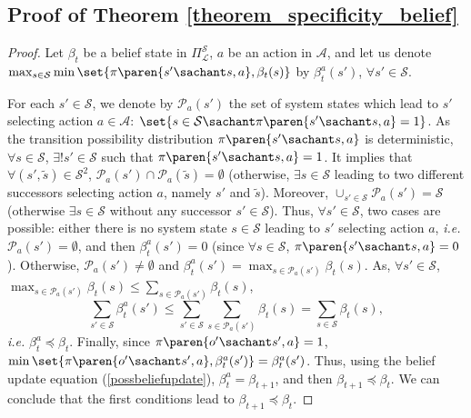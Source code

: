 \subsection{Proof of Theorem \ref{theorem_specificity_belief}}
\label{theorem_specificity_belief_RETURN}
\begin{proof}
Let $\beta_t$ be a belief state in $\Pi^{\mathcal{S}}_{\mathcal{L}}$,
$a$ be an action in $\mathcal{A}$,
and let us denote $\max_{s \in \mathcal{S}}\min \set{ \pi \paren{s' \sachant s,a}, \beta_t(s)}$ 
by $\beta^a_t(s')$, $\forall s' \in \mathcal{S}$.

For each $s' \in \mathcal{S}$, 
we denote by $\mathcal{P}_a(s')$ the set of system states
which lead to $s'$ selecting action $a \in \mathcal{A}$:
$\set{ s \in \mathcal{S} \sachant \pi \paren{ s' \sachant s,a }=1 }$.
As the transition possibility distribution $\pi \paren{ s' \sachant s,a }$ is
deterministic, $\forall s \in \mathcal{S}$, 
$\exists ! s' \in \mathcal{S}$ such that $\pi \paren{ s' \sachant s,a } = 1$.
It implies that $\forall (s',\tilde{s}) \in \mathcal{S}^2$,
$\mathcal{P}_a(s') \cap \mathcal{P}_a(\tilde{s}) = \emptyset$
(otherwise, $\exists s \in \mathcal{S}$ leading 
to two different successors
selecting action $a$, 
namely $s'$ and $\tilde{s}$).
Moreover, $\cup_{s' \in \mathcal{S}} \mathcal{P}_a(s') = \mathcal{S}$
(otherwise $\exists s \in \mathcal{S}$ without any successor $s' \in \mathcal{S}$).
Thus, $\forall s' \in \mathcal{S}$, 
two cases are possible:
either there is no system state $s \in \mathcal{S}$ leading to $s'$
selecting action $a$, 
\textit{i.e.} $\mathcal{P}_a(s')=\emptyset$,
and then $\beta^a_t(s') = 0$
(since $\forall s \in \mathcal{S}$, $\pi \paren{ s' \sachant s,a} = 0$). 
Otherwise, $\mathcal{P}_a(s') \neq \emptyset$
and $\beta^a_t(s') = \max_{s \in \mathcal{P}_a(s')} \beta_t(s)$.
As, $\forall s' \in \mathcal{S}$, $\max_{s \in \mathcal{P}_a(s')} \beta_t(s) \leqslant \sum_{s \in \mathcal{P}_a(s')} \beta_t(s)$,
\[ \sum_{s' \in \mathcal{S}} \beta^a_t(s') \leqslant \sum_{s' \in \mathcal{S}} \sum_{s \in \mathcal{P}_a(s')} \beta_t(s) = \sum_{s \in \mathcal{S}} \beta_t(s),\]
\textit{i.e.}
$\beta^a_t \preceq \beta_t$.
Finally, since $\pi \paren{ o' \sachant s',a }=1$, 
$\min \set{ \pi \paren{ o' \sachant s',a }, \beta^a_t(s') } = \beta^a_t(s')$.
Thus, using the belief update equation (\ref{possbeliefupdate}), $\beta^a_t=\beta_{t+1}$, 
and then $\beta_{t+1} \preceq \beta_t$.
We can conclude that the first conditions lead to $\beta_{t+1} \preceq \beta_t$.


\end{proof}
